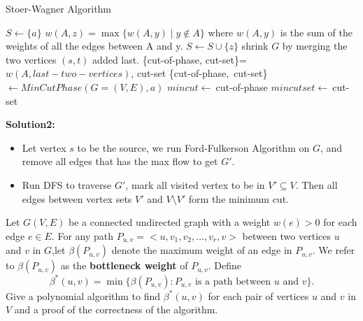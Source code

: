\documentclass{article}
\newcounter{exercise}
\newcommand{\<}{
    \langle}
\renewcommand{\>}{
    \rangle}
\begin{document}
{\begin{itemize}
    \end{itemize}
\begin{algorithm}[htb]
    \caption{Stoer-Wagner Algorithm}
    \begin{algorithmic}[1]
            \State $S \leftarrow \{a\}$
                \State  $w(A,z)=\max\{w(A,y)\mid y\notin A\}$
                \State where $w(A,y)$ is the sum of the weights of all the edges between A and y.
                \State $S\leftarrow S\cup \{z\}$
                \State shrink $G$ by merging the two vertices $(s, t)$ added last.
                \State
                \Return \{cut-of-phase, cut-set\}=$w(A, last-two-vertices)$, cut-set
            \EndWhile      
        \EndProcedure
        \State
                \State \{cut-of-phase,\ cut-set\}$\leftarrow MinCutPhase(G=(V,E),a)$
                \State
                    \State $mincut \leftarrow\ $cut-of-phase
                    \State $mincutset \leftarrow\ $cut-set
                \EndIf
            \EndWhile
        \EndProcedure
    \end{algorithmic}
\end{algorithm}

\textbf{Solution2:}
\begin{itemize}
    \item Let vertex $s$ to be the source, we run Ford-Fulkerson Algorithm on $G$, and remove all edges that has the max flow to get $G'$.
    \item Run DFS to traverse $G'$, mark all visited vertex to be in $V' \subseteq V$. Then all edges between vertex sets $V'$ and $V\setminus V'$ form the minimum cut.
\end{itemize}


\begin{exercise}
Let $G(V,E)$ be a connected undirected graph with a weight $w(e)>0$ for each edge $e\in E$. For any path $P_{u,v}=<u,v_1,v_2,\ldots,v_r,v>$ between two vertices $u$ and $v$ in $G$,let $\beta(P_{u,v})$ denote the maximum weight of an edge in $P_{u,v}$. We refer to $\beta(P_{u,v})$ as the \textbf{bottleneck weight} of $P_{u,v}$. Define
\begin{displaymath}
\beta^*(u,v)=\min\{\beta(P_{u,v}):P_{u,v}\text{ is a path between $u$ and $v$}\}.
\end{displaymath}
Give a polynomial algorithm to find $\beta^*(u,v)$ for each pair of vertices $u$ and $v$ in $V$ and a proof of the correctness of the algorithm.
\end{exercise}

}
\end{document}

